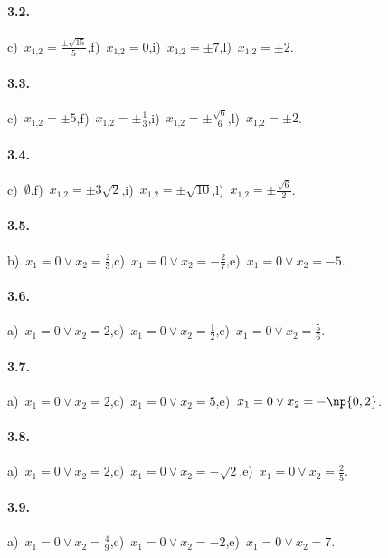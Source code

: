 \paragraph{3.2.} c)~$x_{1\text{,}2} = \frac{\pm \sqrt{15}}{5}$,\quad f)~$x_{1\text{,}2} = 0$,\quad i)~$x_{1\text{,}2} = \pm 7$,\quad l)~$x_{1\text{,}2} = \pm 2$.

\paragraph{3.3.} c)~$x_{1\text{,}2} = \pm 5$,\quad f)~$x_{1\text{,}2} = \pm \frac{1}{3}$,\quad i)~$x_{1\text{,}2} = \pm \frac{\sqrt{6}}{6}$,\quad l)~$x_{1\text{,}2} = \pm 2$.

\paragraph{3.4.} c)~$\emptyset$,\quad f)~$x_{1\text{,}2} = \pm 3 \sqrt{2}$,\quad i)~$x_{1\text{,}2} = \pm \sqrt{10}$,\quad l)~$x_{1\text{,}2} = \pm \frac{\sqrt{6}}{2}$.

\paragraph{3.5.} b)~$x_{1} = 0 \vee x_{2} = \frac{2}{3}$,\quad c)~$x_{1} = 0 \vee x_{2} = - \frac{2}{7}$,\quad e)~$x_{1} = 0 \vee x_{2} = - 5$.

\paragraph{3.6.} a)~$x_{1} = 0 \vee x_{2} = 2$,\quad c)~$x_{1} = 0 \vee x_{2} = \frac{1}{2}$,\quad e)~$x_{1} = 0 \vee x_{2} = \frac{5}{6}$.

\paragraph{3.7.} a)~$x_{1} = 0 \vee x_{2} = 2$,\quad c)~$x_{1} = 0 \vee x_{2} = 5$,\quad e)~$x_{1} = 0 \vee x_{2} = - \np{0,2}$.

\paragraph{3.8.} a)~$x_{1} = 0 \vee x_{2} = 2$,\quad c)~$x_{1} = 0 \vee x_{2} = - \sqrt{2}$,\quad e)~$x_{1} = 0 \vee x_{2} = \frac{2}{5}$.

\paragraph{3.9.} a)~$x_{1} = 0 \vee x_{2} = \frac{4}{9}$,\quad c)~$x_{1} = 0 \vee x_{2} = - 2$,\quad e)~$x_{1} = 0 \vee x_{2} = 7$.

